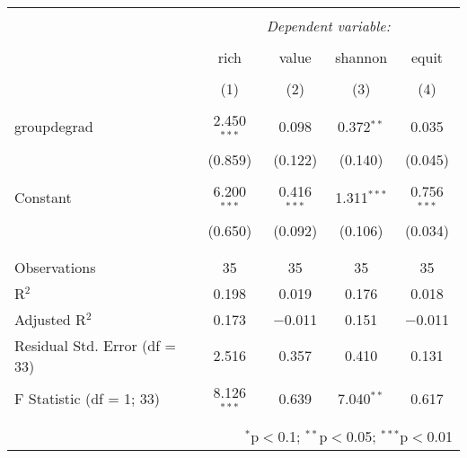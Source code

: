 
\begin{table}[!htbp] \centering 
  \caption{} 
  \label{} 
\begin{tabular}{@{\extracolsep{5pt}}lcccc} 
\\[-1.8ex]\hline 
\hline \\[-1.8ex] 
 & \multicolumn{4}{c}{\textit{Dependent variable:}} \\ 
\cline{2-5} 
\\[-1.8ex] & rich & value & shannon & equit \\ 
\\[-1.8ex] & (1) & (2) & (3) & (4)\\ 
\hline \\[-1.8ex] 
 groupdegrad & 2.450$^{***}$ & 0.098 & 0.372$^{**}$ & 0.035 \\ 
  & (0.859) & (0.122) & (0.140) & (0.045) \\ 
  & & & & \\ 
 Constant & 6.200$^{***}$ & 0.416$^{***}$ & 1.311$^{***}$ & 0.756$^{***}$ \\ 
  & (0.650) & (0.092) & (0.106) & (0.034) \\ 
  & & & & \\ 
\hline \\[-1.8ex] 
Observations & 35 & 35 & 35 & 35 \\ 
R$^{2}$ & 0.198 & 0.019 & 0.176 & 0.018 \\ 
Adjusted R$^{2}$ & 0.173 & $-$0.011 & 0.151 & $-$0.011 \\ 
Residual Std. Error (df = 33) & 2.516 & 0.357 & 0.410 & 0.131 \\ 
F Statistic (df = 1; 33) & 8.126$^{***}$ & 0.639 & 7.040$^{**}$ & 0.617 \\ 
\hline 
\hline \\[-1.8ex] 
\multicolumn{5}{r}{$^{*}$p$<$0.1; $^{**}$p$<$0.05; $^{***}$p$<$0.01} \\ 
\end{tabular} 
\end{table} 
